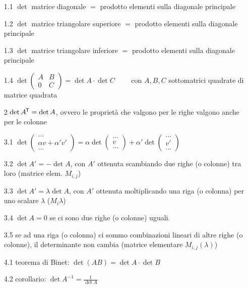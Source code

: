 \documentclass[a4paper]{article}
\newcommand\tran{^{\mkern-1.5mu\mathsf{T}}} %
\begin{document}
\begin{enumerate}
	\item[1.1] \(\det\) matrice diagonale \(=\) prodotto elementi sulla diagonale principale
	\item[1.2] \(\det\) matrice triangolare superiore \(=\) prodotto elementi sulla diagonale principale
	\item[1.3] \(\det\) matrice triangolare inferiore \(=\) prodotto elementi sulla diagonale principale
	\item[1.4] \(\det \left( \begin{matrix} A & B \\ 0 & C \end{matrix} \right) = \det A \cdot \det C \qquad\) con \(A, B, C\) sottomatrici quadrate di matrice quadrata
	\item[2] \(\det A\tran = \det A\), ovvero le proprietà che valgono per le righe valgono anche per le colonne
	\item[3.1] \(\det \left( \begin{matrix} \dots \\ \alpha v + \alpha' v' \\ \dots \end{matrix} \right) = \alpha \det \left( \begin{matrix} \dots \\ v \\ \dots \end{matrix} \right) + \alpha' \det \left( \begin{matrix} \dots \\ v' \\ \dots \end{matrix} \right)\)
	\item[3.2] \(\det A' = -\det A\), con \(A'\) ottenuta scambiando due righe (o colonne) tra loro (matrice elem. \(M_{i,j}\))
	\item[3.3] \(\det A' = \lambda \det A\), con \(A'\) ottenuta moltiplicando una riga (o colonna) per uno scalare \(\lambda\) (\(M_{i}\lambda\))
	\item[3.4] \(\det A = 0\) se ci sono due righe (o colonne) uguali.
	\item[3.5] se ad una riga (o colonna) ci sommo combinazioni lineari di altre righe (o colonne), il determinante non cambia (matrice elementare \(M_{i,j}(\lambda)\))
	\item[4.1] teorema di Binet: \(\det (AB) = \det A \cdot \det B\)
	\item[4.2] corollario: \(\det A^{-1} = \frac{1}{\det A}\)
\end{enumerate}
\end{document}
